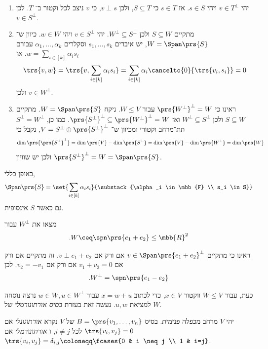 \documentclass[a4paper,10pt,twoside,openany]{book}
\begin{document}
\begin{solution}
\begin{enumerate}
\item
יהי
$v \in T^\perp$
ויהי
$s \in S$.
אז
$s \in T$
כי
$S \subseteq T$,
ולכן
$v \perp s$,
כי
$v$
ניצב לכל וקטור ב־%
$T$.
לכן
$v \in S^\perp$.

\item
מתקיים
$S \subseteq W$
ולכן
$W^\perp \subseteq S^\perp$.
יהי
$v \in S^\perp$
ויהי
$w \in W$.
כיוון ש־%
$W = \Span\prs{S}$,
יש איברים
$s_1, \ldots, s_k$
וסקלרים
$\alpha_1, \ldots, \alpha_k$
עבורם
$w = \sum_{i \in [k]} \alpha_i s_i$.
אז
\[\trs{v,w} = \trs{v, \sum_{i \in [k]} \alpha_i s_i} = \sum_{i \in [k]} \alpha_i \cancelto{0}{\trs{v_i, s_i}} = 0\]
ולכן
$v \in W^\perp$.

\item
ראינו כי
$\prs{W^\perp}^\perp = W$
עבור
$W \leq V$.
ניקח
$W = \Span\prs{S}$.
מתקיים
$S \subseteq W$
ולכן
$W^\perp \subseteq S^\perp$
ואז
$\prs{S^\perp}^\perp \subseteq \prs{W^\perp}^\perp = W$.
כמו כן,
$S^\perp = W^\perp$
תת־מרחב וקטורי ומכיוון ש־%
$V = S^\perp \oplus \prs{S^\perp}^\perp$,
נקבל כי
\[\dim\prs{\prs{S^\perp}^\perp} = \dim\prs{V} - \dim\prs{S^\perp} = \dim\prs{V} - \dim\prs{W^\perp} = \dim\prs{W}\]
ולכן יש שוויון
$\prs{S^\perp}^\perp = W = \Span\prs{S}$.
\end{enumerate}
\end{solution}

\begin{remark}
באופן כללי,
\[\Span\prs{S} = \set{\sum_{i \in [k]} \alpha_i s_i}{\substack{\alpha_i \in \mbb{F} \\ s_i \in S}}\]
גם כאשר
$S$
אינסופית.
\end{remark}

\begin{exercisechap}
מצאו את
$W^\perp$
עבור
\[\text{.} W \ceq \spn\prs{e_1 + e_2} \leq \mbb{R}^2\]
\end{exercisechap}

\begin{solution}
ראינו כי מתקיים
$v \in \Span\prs{e_1 + e_2}^\perp$
אם ורק אם
$v \perp e_1 + e_2$.
זה מתקיים
אם ורק אם
$v_1 + v_2 = 0$
אם ורק אם
$v_2 = - v_1$.
לכן
\[\text{.} W^\perp = \spn\prs{e_1 - e_2}\]
\end{solution}

כעת, עבור
$W \leq V$
ווקטור
$x \in V$,
כדי לכתוב
$x = w + u$
עבור
$w \in W, u \in W^\perp$
נרצה נוסחה למציאת
$u,w$.
נעשה זאת בעזרת
\emph{בסיס אורתונורמלי}
של
$W$.

\begin{definition}
יהי
$V$
מרחב מכפלה פנימית.
בסיס
$B = \prs{v_1, \ldots, v_n}$
של
$V$
נקרא
\emph{אורתוגונלי}
אם
$\trs{v_i, v_j} = 0$
לכל
$i \neq j$,
ו%
\emph{אורתונורמלי}
אם
$\trs{v_i, v_j} = \delta_{i,j} \coloneqq \fcases{0 & i \neq j \\ 1 & i=j}$.
\end{definition}
\end{document}

